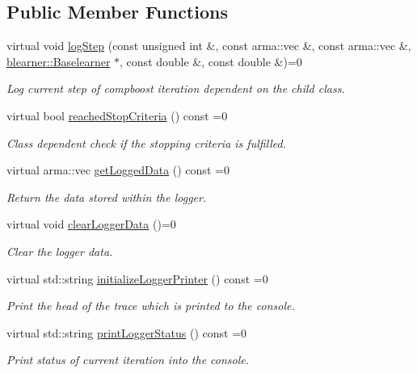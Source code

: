 \subsection*{Public Member Functions}
\begin{DoxyCompactItemize}
\item 
virtual void \hyperlink{classlogger_1_1_logger_a91d987a86698e455b6fd3468f266d3fe}{log\+Step} (const unsigned int \&, const arma\+::vec \&, const arma\+::vec \&, \hyperlink{classblearner_1_1_baselearner}{blearner\+::\+Baselearner} $\ast$, const double \&, const double \&)=0
\begin{DoxyCompactList}\small\item\em Log current step of compboost iteration dependent on the child class. \end{DoxyCompactList}\item 
virtual bool \hyperlink{classlogger_1_1_logger_aed91421c07062b91cee158ef2bda7ae8}{reached\+Stop\+Criteria} () const =0
\begin{DoxyCompactList}\small\item\em Class dependent check if the stopping criteria is fulfilled. \end{DoxyCompactList}\item 
virtual arma\+::vec \hyperlink{classlogger_1_1_logger_aa4fc254c532172db3404b7c0bcd17092}{get\+Logged\+Data} () const =0
\begin{DoxyCompactList}\small\item\em Return the data stored within the logger. \end{DoxyCompactList}\item 
virtual void \hyperlink{classlogger_1_1_logger_a8c68db2430fa84b67528bfa6ae45a516}{clear\+Logger\+Data} ()=0
\begin{DoxyCompactList}\small\item\em Clear the logger data. \end{DoxyCompactList}\item 
virtual std\+::string \hyperlink{classlogger_1_1_logger_a825f96e8564ac4013ff09ef842c0aeec}{initialize\+Logger\+Printer} () const =0
\begin{DoxyCompactList}\small\item\em Print the head of the trace which is printed to the console. \end{DoxyCompactList}\item 
virtual std\+::string \hyperlink{classlogger_1_1_logger_abad818a7e8053ca84cb267e883b5e377}{print\+Logger\+Status} () const =0
\begin{DoxyCompactList}\small\item\em Print status of current iteration into the console. \end{DoxyCompactList}\item 

\end{DoxyCompactItemize}
